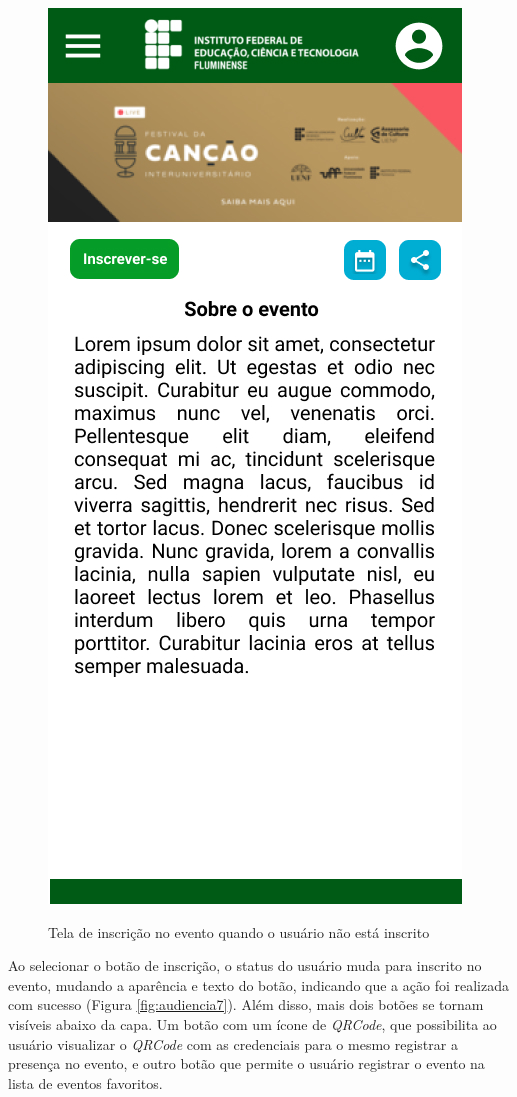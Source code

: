 \begin{figure}[H]
    \centering
    \caption{Tela de inscrição no evento quando o usuário não está inscrito}
    \includegraphics[scale=0.44]{figuras/Audiencia/6-Evento.jpg}
    \label{fig:audiencia6}
\end{figure}

Ao selecionar o botão de inscrição, o status do usuário muda para inscrito no evento, mudando a aparência e texto do botão, indicando que a ação foi realizada com sucesso (Figura \ref{fig:audiencia7}). Além disso, mais dois botões se tornam visíveis abaixo da capa. Um botão com um ícone de \textit{QRCode}, que possibilita ao usuário visualizar o \textit{QRCode} com as credenciais para o mesmo registrar a presença no evento, e outro botão que permite o usuário registrar o evento na lista de eventos favoritos.

